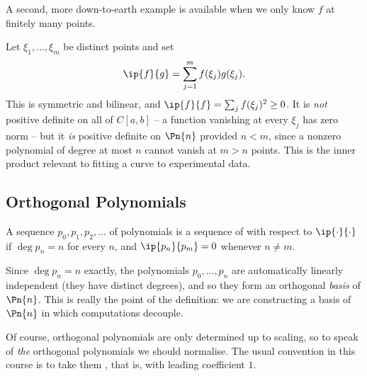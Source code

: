 A second, more down-to-earth example is available when we only know $f$ at finitely many points.

\begin{example}
  Let $\xi_1, \dots, \xi_m$ be distinct points and set
  $$
  \ip{f}{g} = \sum_{j=1}^{m} f(\xi_j) g(\xi_j).
  $$
  This is symmetric and bilinear, and $\ip{f}{f} = \sum_j f(\xi_j)^2 \geq 0$. It is \emph{not} positive definite on all of $C[a,b]$ -- a function vanishing at every $\xi_j$ has zero norm -- but it \emph{is} positive definite on $\Pn{n}$ provided $n < m$, since a nonzero polynomial of degree at most $n$ cannot vanish at $m > n$ points. This is the inner product relevant to fitting a curve to experimental data.
\end{example}

\subsection{Orthogonal Polynomials}

\begin{definition}
  A sequence $p_0, p_1, p_2, \dots$ of polynomials is a sequence of  with respect to $\ip{\cdot}{\cdot}$ if $\deg p_n = n$ for every $n$, and $\ip{p_n}{p_m} = 0$ whenever $n \neq m$.
\end{definition}

Since $\deg p_n = n$ exactly, the polynomials $p_0, \dots, p_n$ are automatically linearly independent (they have distinct degrees), and so they form an orthogonal \emph{basis} of $\Pn{n}$. This is really the point of the definition: we are constructing a basis of $\Pn{n}$ in which computations decouple.

Of course, orthogonal polynomials are only determined up to scaling, so to speak of \emph{the} orthogonal polynomials we should normalise. The usual convention in this course is to take them , that is, with leading coefficient $1$.

